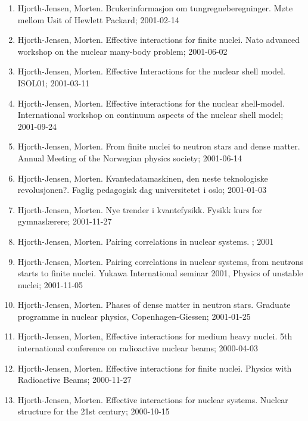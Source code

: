 \documentclass[%
oneside,                 %
final,                   %
10pt]{article}
\begin{document}
\begin{enumerate}
\item Hjorth-Jensen, Morten. Brukerinformasjon om tungregneberegninger. Møte mellom Usit of Hewlett Packard; 2001-02-14

\item Hjorth-Jensen, Morten. Effective interactions for finite nuclei. Nato advanced workshop on the nuclear many-body problem; 2001-06-02

\item Hjorth-Jensen, Morten. Effective Interactions for the nuclear shell model. ISOL01; 2001-03-11

\item Hjorth-Jensen, Morten. Effective interactions for the nuclear shell-model. International workshop on continuum aspects of the nuclear shell model; 2001-09-24

\item Hjorth-Jensen, Morten. From finite nuclei to neutron stars and dense matter. Annual Meeting of the Norwegian physics society; 2001-06-14

\item Hjorth-Jensen, Morten. Kvantedatamaskinen, den neste teknologiske revolusjonen?. Faglig pedagogisk dag universitetet i oslo; 2001-01-03

\item Hjorth-Jensen, Morten. Nye trender i kvantefysikk. Fysikk kurs for gymnaslærere; 2001-11-27

\item Hjorth-Jensen, Morten. Pairing correlations in nuclear systems. ; 2001

\item Hjorth-Jensen, Morten. Pairing correlations in nuclear systems, from neutrons starts to finite nuclei. Yukawa International seminar 2001, Physics of unstable nuclei; 2001-11-05

\item Hjorth-Jensen, Morten. Phases of dense matter in neutron stars. Graduate programme in nuclear physics, Copenhagen-Giessen; 2001-01-25

\item Hjorth-Jensen, Morten, Effective interactions for medium heavy nuclei. 5th international conference on radioactive nuclear beams; 2000-04-03

\item Hjorth-Jensen, Morten. Effective interactions for finite nuclei. Physics with Radioactive Beams; 2000-11-27

\item Hjorth-Jensen, Morten. Effective interactions for nuclear systems. Nuclear structure for the 21st century; 2000-10-15


\end{enumerate}
\end{document}
